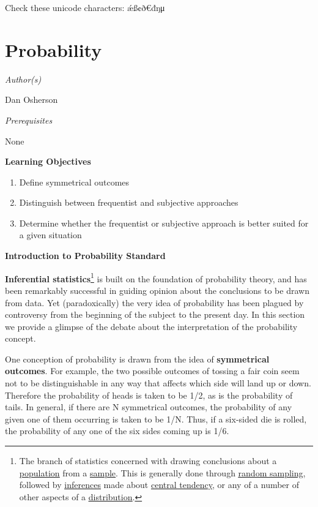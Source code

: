 \documentclass{book}
\begin{document}
Check these unicode characters: ǽß¢ð€đŋμ

\hypertarget{probability}{%
\chapter{Probability}\label{probability}}

\emph{Author(s)}

Dan Osherson

\emph{Prerequisites}

None

\textbf{Learning Objectives}

\begin{enumerate}
\def\labelenumi{\arabic{enumi}.}
\item
  Define symmetrical outcomes
\item
  Distinguish between frequentist and subjective approaches
\item
  Determine whether the frequentist or subjective approach is better suited
  for a given situation
\end{enumerate}

\textbf{Introduction to Probability Standard}

\textbf{Inferential statistics}\footnote{The branch of statistics concerned
  with drawing conclusions about a
  \href{https://onlinestatbook.com/2/glossary/population.html}{\underline{population}}
  from a
  \href{https://onlinestatbook.com/2/glossary/sample.html}{\underline{sample}}.
  This is generally done through
  \href{https://onlinestatbook.com/2/glossary/random_sampling.html}{\underline{random
  sampling}}, followed by
  \href{https://onlinestatbook.com/2/glossary/inference.html}{\underline{inferences}}
  made about
  \href{https://onlinestatbook.com/2/glossary/center(distribution).html}{\underline{central
  tendency}}, or any of a number of other aspects of a
  \href{https://onlinestatbook.com/2/glossary/distribution.html}{\underline{distribution}}.}
is built on the foundation of probability theory, and has been remarkably
successful in guiding opinion about the conclusions to be drawn from data. Yet
(paradoxically) the very idea of probability has been plagued by controversy
from the beginning of the subject to the present day. In this section we
provide a glimpse of the debate about the interpretation of the probability
concept.

One conception of probability is drawn from the idea of \textbf{symmetrical
outcomes}. For example, the two possible outcomes of tossing a fair coin seem
not to be distinguishable in any way that affects which side will land up or
down. Therefore the probability of heads is taken to be 1/2, as is the
probability of tails. In general, if there are N symmetrical outcomes, the
probability of any given one of them occurring is taken to be 1/N. Thus, if a
six-sided die is rolled, the probability of any one of the six sides coming up
is 1/6.
\end{document}
